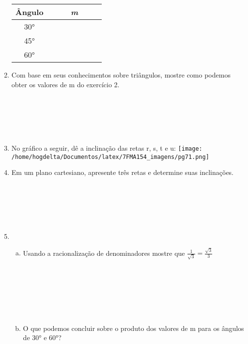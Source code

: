 \documentclass[a4paper,14pt]{article}
\begin{document}
\begin{multicols}{2}
\begin{enumerate}
\begin{center}
		    	\begin{tabular}{|c|c|} %
		    		\hline %
		    		\textbf{Ângulo} & \textbf{\textit{m}} \\ %
		    		\hline %
		    		30° & ~~~~~~~~~~~~ \\ %
		    		\hline %
		    		45° & ~~~~~~~~~~~~ \\ %
		    		\hline %
		    		60° & ~~~~~~~~~~~~ \\ %
		    		\hline %
		    	\end{tabular}
	    	\end{center}
	    	\item Com base em seus conhecimentos sobre triângulos, mostre como podemos obter os valores de m do exercício 2.
	    	\\\\\\\\\\\\
	    	\item No gráfico a seguir, dê a inclinação das retas r, s, t e u:
	    	\texttt{[image: /home/hogdelta/Documentos/latex/7FMA154\_imagens/pg71.png]}
	    	\item Em um plano cartesiano, apresente três retas e determine suas inclinações.\\\\\\\\\\\\
	    	\item 
	    	\begin{enumerate}[a)]
	    		\item Usando a racionalização de denominadores mostre que $\frac{1}{\sqrt{3}} = \frac{\sqrt{3}}{3}$\\\\\\\\\\\\\\
	    		\item O que podemos concluir sobre o produto dos valores de m para os ângulos de 30° e 60°?\\\\\\\\\\

\end{enumerate}
\end{enumerate}
\end{multicols}
\end{document}
